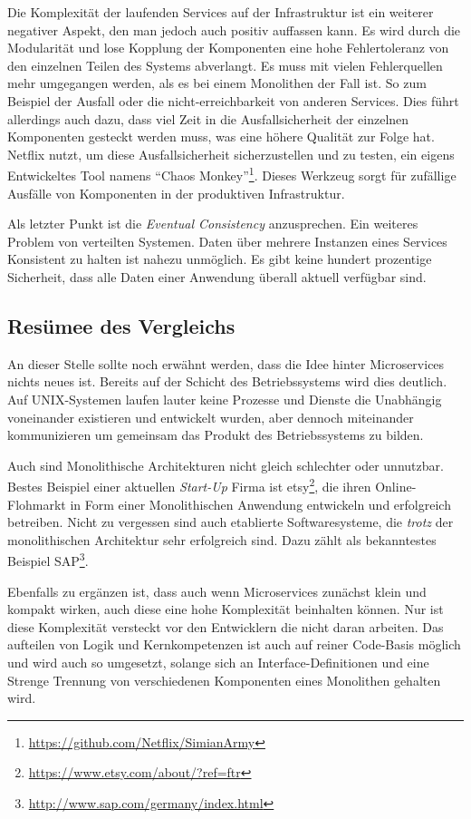 \documentclass[12pt,a4paper,bibliography=totocnumbered,listof=totocnumbered]{scrartcl}
\begin{document}
Die Komplexität der laufenden Services auf der Infrastruktur ist ein weiterer negativer Aspekt, den man jedoch auch positiv auffassen kann. Es wird durch die Modularität und lose Kopplung der Komponenten eine hohe Fehlertoleranz von den einzelnen Teilen des Systems abverlangt. Es muss mit vielen Fehlerquellen mehr umgegangen werden, als es bei einem Monolithen der Fall ist. So zum Beispiel der Ausfall oder die nicht-erreichbarkeit von anderen Services. Dies führt allerdings auch dazu, dass viel Zeit in die Ausfallsicherheit der einzelnen Komponenten gesteckt werden muss, was eine höhere Qualität zur Folge hat. Netflix nutzt, um diese Ausfallsicherheit sicherzustellen und zu testen, ein eigens Entwickeltes Tool namens \enquote{Chaos Monkey}\footnote{\url{https://github.com/Netflix/SimianArmy}}. Dieses Werkzeug sorgt für zufällige Ausfälle von Komponenten in der produktiven Infrastruktur.

Als letzter Punkt ist die \textit{Eventual Consistency} anzusprechen. Ein weiteres Problem von verteilten Systemen. Daten über mehrere Instanzen eines Services Konsistent zu halten ist nahezu unmöglich. Es gibt keine hundert prozentige Sicherheit, dass alle Daten einer Anwendung überall aktuell verfügbar sind.

\subsection{Resümee des Vergleichs}

An dieser Stelle sollte noch erwähnt werden, dass die Idee hinter Microservices nichts neues ist. Bereits auf der Schicht des Betriebssystems wird dies deutlich. Auf UNIX-Systemen laufen lauter keine Prozesse und Dienste die Unabhängig voneinander existieren und entwickelt wurden, aber dennoch miteinander kommunizieren um gemeinsam das Produkt des Betriebssystems zu bilden.\cite{hoff}

Auch sind Monolithische Architekturen nicht gleich schlechter oder unnutzbar. Bestes Beispiel einer aktuellen \textit{Start-Up} Firma ist etsy\footnote{\url{https://www.etsy.com/about/?ref=ftr}}, die ihren Online-Flohmarkt in Form einer Monolithischen Anwendung entwickeln und erfolgreich betreiben. Nicht zu vergessen sind auch etablierte Softwaresysteme, die \textit{trotz} der monolithischen Architektur sehr erfolgreich sind. Dazu zählt als bekanntestes Beispiel SAP\footnote{\url{http://www.sap.com/germany/index.html}}.

Ebenfalls zu ergänzen ist, dass auch wenn Microservices zunächst klein und kompakt wirken, auch diese eine hohe Komplexität beinhalten können. Nur ist diese Komplexität versteckt vor den Entwicklern die nicht daran arbeiten. Das aufteilen von Logik und Kernkompetenzen ist auch auf reiner Code-Basis möglich und wird auch so umgesetzt, solange sich an Interface-Definitionen und eine Strenge Trennung von verschiedenen Komponenten eines Monolithen gehalten wird.\cite{hoff}
\end{document}
